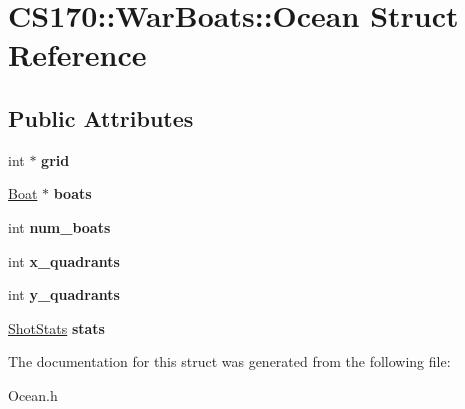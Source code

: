 \hypertarget{struct_c_s170_1_1_war_boats_1_1_ocean}{\section{C\-S170\-:\-:War\-Boats\-:\-:Ocean Struct Reference}
\label{struct_c_s170_1_1_war_boats_1_1_ocean}
}
\subsection*{Public Attributes}
\begin{DoxyCompactItemize}
\item 
\hypertarget{struct_c_s170_1_1_war_boats_1_1_ocean_aa21f050720dd8df7d720b502eb1bede6}{int $\ast$ {\bfseries grid}}\label{struct_c_s170_1_1_war_boats_1_1_ocean_aa21f050720dd8df7d720b502eb1bede6}

\item 
\hypertarget{struct_c_s170_1_1_war_boats_1_1_ocean_a2abd444b6f28175d5814657c16539ee0}{\hyperlink{struct_c_s170_1_1_war_boats_1_1_boat}{Boat} $\ast$ {\bfseries boats}}\label{struct_c_s170_1_1_war_boats_1_1_ocean_a2abd444b6f28175d5814657c16539ee0}

\item 
\hypertarget{struct_c_s170_1_1_war_boats_1_1_ocean_aba88240a1fcc23d755f7952d43e92831}{int {\bfseries num\-\_\-boats}}\label{struct_c_s170_1_1_war_boats_1_1_ocean_aba88240a1fcc23d755f7952d43e92831}

\item 
\hypertarget{struct_c_s170_1_1_war_boats_1_1_ocean_a292d54971a0d5dd0e7e77a3fa192eb40}{int {\bfseries x\-\_\-quadrants}}\label{struct_c_s170_1_1_war_boats_1_1_ocean_a292d54971a0d5dd0e7e77a3fa192eb40}

\item 
\hypertarget{struct_c_s170_1_1_war_boats_1_1_ocean_aee28614cf1d78cc680c12a373c1960e9}{int {\bfseries y\-\_\-quadrants}}\label{struct_c_s170_1_1_war_boats_1_1_ocean_aee28614cf1d78cc680c12a373c1960e9}

\item 
\hypertarget{struct_c_s170_1_1_war_boats_1_1_ocean_a686f9fd1db3df6e8dea8a64eeccda20b}{\hyperlink{struct_c_s170_1_1_war_boats_1_1_shot_stats}{Shot\-Stats} {\bfseries stats}}\label{struct_c_s170_1_1_war_boats_1_1_ocean_a686f9fd1db3df6e8dea8a64eeccda20b}

\end{DoxyCompactItemize}


The documentation for this struct was generated from the following file\-:\begin{DoxyCompactItemize}
\item 
Ocean.\-h\end{DoxyCompactItemize}
